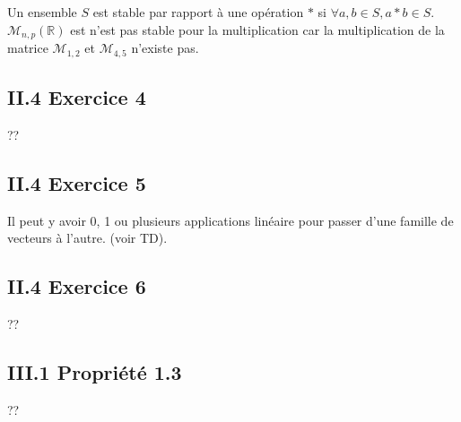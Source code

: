\documentclass[]{book}
\theoremstyle{definition}
\newcommand{\bb}[1]{\mathbb{#1}}
\newcommand{\R}{\bb{R}}
\begin{document}
Un ensemble $S$ est stable par rapport \`a une op\'eration $*$ si $\forall a, b \in S, a * b \in S$. $\mathcal{M}_{n,p}(\R)$ est n'est pas stable pour la multiplication car la multiplication de la matrice $\mathcal{M}_{1,2}$ et $\mathcal{M}_{4,5}$ n'existe pas.

\subsection*{II.4 Exercice 4}
??
\subsection*{II.4 Exercice 5}
Il peut y avoir 0, 1 ou plusieurs applications lin\'eaire pour passer d'une famille de vecteurs \`a l'autre. (voir TD). 
\subsection*{II.4 Exercice 6}
??

\subsection*{III.1 Propri\'et\'e 1.3}
??
\end{document}

